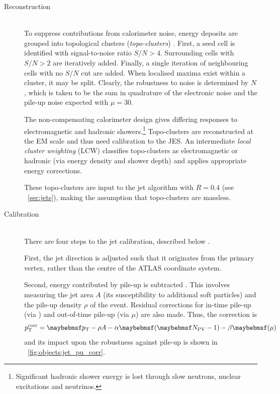 \begin{description}
\item[Reconstruction] \hfill \\
	To suppress contributions from calorimeter noise, energy deposits are grouped into 
	topological clusters (\textit{topo-clusters}) \cite{Jets:Calib:2010,Jets:Calib:2011}. 
	First, a seed cell is identified with signal-to-noise ratio $S/N > 4$. Surrounding 
	cells with $S/N > 2$ are iteratively added. Finally, a single iteration of 
	neighbouring cells with no $S/N$ cut are added. When localised maxima exist within a 
	cluster, it may be split. Clearly, the robustness to noise is determined by $N$, 
	which is taken to be the sum in quadrature of the electronic noise and the pile-up 
	noise expected with $\mu = 30$.

	The non-compensating calorimeter design gives differing responses to electromagnetic 
	and hadronic showers.\footnote{
		Significant hadronic shower energy is lost through slow neutrons, nuclear 
		excitations and neutrinos.
	}
	Topo-clusters are reconstructed at the EM scale and thus need calibration to the 
	\ac{JES}. An intermediate \textit{local cluster weighting} (LCW) classifies 
	topo-clusters as electromagnetic or hadronic (via energy density and shower depth) 
	and applies appropriate energy corrections.
	
	These topo-clusters are input to the \antikt jet algorithm with $R = 0.4$ (see 
	\Section~\ref{sec:jets}), making the assumption that topo-clusters are massless.
\item[Calibration] \hfill \\
	There are four steps to the jet calibration, described below \cite{Jets:Calib:2011}.

	First, the jet direction is adjusted such that it originates from the primary vertex, 
	rather than the centre of the ATLAS coordinate system.

	Second, energy contributed by pile-up is subtracted \cite{Jets:PileupCorrection:2012}.
	This involves measuring the jet area $A$ (its susceptibility to additional soft 
	particles) and the pile-up density $\rho$ of the event. Residual corrections for 
	in-time pile-up (via \npv) and out-of-time pile-up (via $\mu$) are also made. Thus,
	the correction is
	\begin{equation}
		p_{\text{T}}^{\text{corr}} = \pt - \rho A - \alpha \parenths{\npv - 1} 
		- \beta \parenths{\mu}
	\end{equation}
	and its impact upon the robustness against pile-up is shown in 
	\Figure~\ref{fig:objects:jet_pu_corr}.


\end{description}
